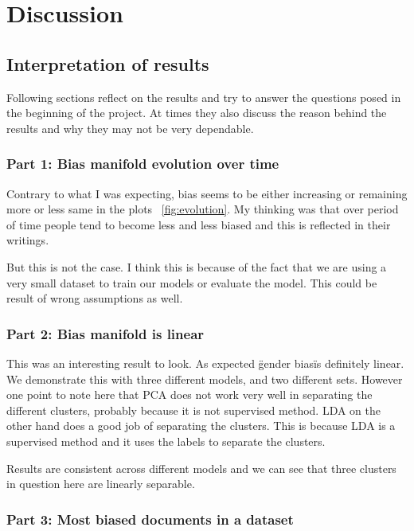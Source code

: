 \documentclass{article}
\begin{document}
\section{Discussion}

\subsection{Interpretation of results}

Following sections reflect on the results and try to answer the questions posed in the beginning of the project. At times they also discuss the reason behind the results and why they may not be very dependable.

\subsubsection{Part 1: Bias manifold evolution over time}

Contrary to what I was expecting, bias seems to be either increasing or remaining more or less same in the plots ~\ref{fig:evolution}. My thinking was that over period of time people tend to become less and less biased and this is reflected in their writings.

But this is not the case. I think this is because of the fact that we are using a very small dataset to train our models or evaluate the model. This could be result of wrong assumptions as well.


\subsubsection{Part 2: Bias manifold is linear}

This was an interesting result to look. As expected \"gender bias\" is definitely linear. We demonstrate this with three different models, and two different sets. However one point to note here that PCA does not work very well in separating the different clusters, probably because it is not supervised method. LDA on the other hand does a good job of separating the clusters. This is because LDA is a supervised method and it uses the labels to separate the clusters.

Results are consistent across different models and we can see that three clusters in question here are linearly separable.


\subsubsection{Part 3: Most biased documents in a dataset}
\end{document}
